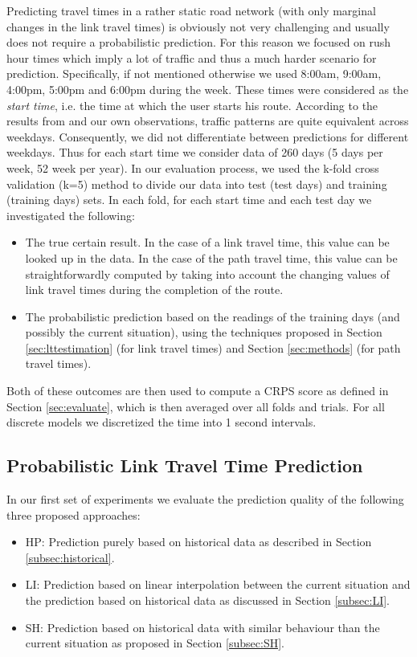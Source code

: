 Predicting travel times in a rather static road network (with only marginal
changes in the link travel times) is obviously not very challenging and usually does not require a probabilistic prediction. For this reason we focused on rush hour times which imply a lot of traffic and thus a much harder scenario for prediction. Specifically, if not mentioned otherwise we used 8:00am, 9:00am, 4:00pm, 5:00pm and 6:00pm during the week. These times were considered as the \textit{start time}, i.e. the time at which the user starts his route.
According to the results from \cite{PanDS12} and our own observations, traffic patterns are quite equivalent across weekdays. Consequently, we did not differentiate between predictions for different weekdays. Thus for each start time we consider data of 260 days (5 days per week, 52 week per year). In our evaluation process, we used the k-fold cross validation (k=5) method to divide our data into test (test days) and training (training days) sets. In each fold, for each start time and each test day we investigated the following:
\begin{itemize}
  \item The true certain result. In the case of a link travel time, this
  value can be looked up in the data. In the case of the path travel time, this
  value can be straightforwardly computed by taking into account the changing values
  of link travel times during the completion of the route.
  \item The probabilistic prediction based on the readings of the training days
  (and possibly the current situation), using the techniques proposed in Section
  \ref{sec:lttestimation} (for link travel times) and Section \ref{sec:methods}
  (for path travel times).
\end{itemize}
Both of these outcomes are then used to compute a CRPS score as defined
in Section \ref{sec:evaluate}, which is then averaged over all folds and trials.
For all discrete models we discretized the time into 1 second intervals.

\subsection{Probabilistic Link Travel Time Prediction}
In our first set of experiments we evaluate the prediction quality of
the following three proposed approaches:
\begin{itemize}
  \item HP: Prediction purely based on historical data as described in Section
  \ref{subsec:historical}.
  \item LI: Prediction based on linear interpolation between the current
  situation and the prediction based on historical data as discussed in Section
  \ref{subsec:LI}.
  \item SH: Prediction based on historical data with similar behaviour than the
  current situation as proposed in Section \ref{subsec:SH}.
\end{itemize}

